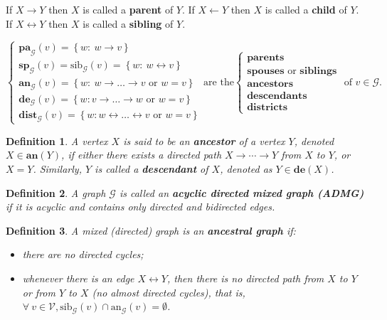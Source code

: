 \documentclass[a4paper]{article}
\newtheorem{definition}{Definition}
\begin{document}
	If $X \rightarrow Y$ then $X$ is called a \textbf{parent} of $Y$. If $X \leftarrow Y$ then $X$ is called a \textbf{child} of $Y$. If $X \leftrightarrow Y$ then $X$ is called a \textbf{sibling} of $Y$.

\begin{equation*}
	\begin{cases}
		\textbf{pa}_{\mathcal{G}}(v) = \left\{ w : ~w \rightarrow v\right\} \\
		\textbf{sp}_{\mathcal{G}}(v) = \text{sib}_{\mathcal{G}}(v)= \left\{ w: ~w \leftrightarrow v \right\} \\
		\textbf{an}_{\mathcal{G}}(v) = \left\{ w: ~w \rightarrow \ldots \rightarrow v \text{ or } w = v\right\} \\
		\textbf{de}_{\mathcal{G}}(v) = \left\{ w: v \rightarrow \ldots \rightarrow w \text{ or } w = v \right\} \\
		\textbf{dist}_{\mathcal{G}}(v) = \left\{ w: w \leftrightarrow \ldots \leftrightarrow v \text{ or } w = v \right\}
	\end{cases}
	\text{are the} 
	\begin{cases}
		\textbf{parents} \\
		\textbf{spouses } \text{or} \textbf{ siblings} \\
		\textbf{ancestors} \\
		\textbf{descendants} \\
		\textbf{districts}
	\end{cases}
	\text{ of } v \in \mathcal{G}.
\end{equation*}

\begin{definition}\label{def:ancestral}
	A vertex $X$ is said to be an \textbf{ancestor} of a vertex $Y$, denoted $X \in \textbf{an}(Y)$, if either there exists a directed path $X \rightarrow \cdots \rightarrow Y$ from $X$ to $Y$, or $X=Y$. Similarly, $Y$ is called a \textbf{descendant} of $X$, denoted as $Y \in \textbf{de}(X)$.
\end{definition}

\begin{definition}
	A graph $\mathcal{G}$ is called an \textbf{acyclic directed mixed graph (ADMG)} if it is \textit{acyclic} and contains \textit{only directed and bidirected edges.}
\end{definition}

	\begin{definition}A mixed (directed) graph is an \textbf{ancestral graph} if:
	\begin{itemize}
		\item there are no directed cycles;
		\item whenever there is an edge $X \leftrightarrow Y$, then there is no directed path from $X$ to $Y$ or from $Y$ to $X$ (no almost directed cycles), that is, $\forall ~v \in \mathcal{V}, \text{sib}_\mathcal{G}(v) \cap \text{an}_\mathcal{G}(v) = \emptyset$.
	\end{itemize}
\end{definition}
\end{document}
